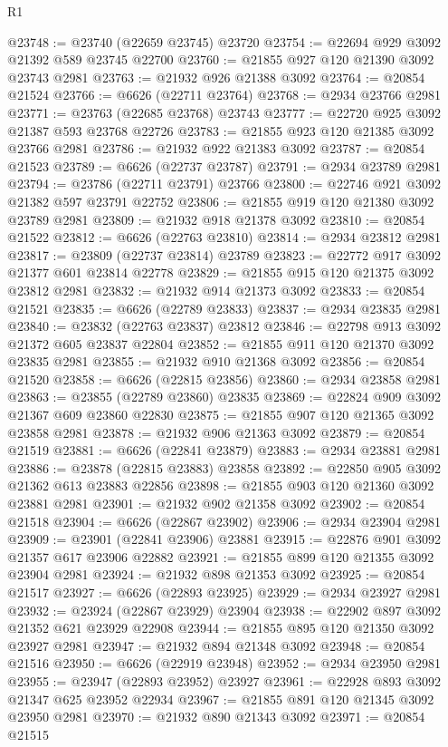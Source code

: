 \begin{lexlean}{R1}
\begin{coremodule}
@23748 := @23740 (@22659 @23745) @23720
@23754 := @22694 @929 @3092 @21392 @589 @23745 @22700
@23760 := @21855 @927 @120 @21390 @3092 @23743 @2981
@23763 := @21932 @926 @21388 @3092
@23764 := @20854 @21524
@23766 := @6626 (@22711 @23764)
@23768 := @2934 @23766 @2981
@23771 := @23763 (@22685 @23768) @23743
@23777 := @22720 @925 @3092 @21387 @593 @23768 @22726
@23783 := @21855 @923 @120 @21385 @3092 @23766 @2981
@23786 := @21932 @922 @21383 @3092
@23787 := @20854 @21523
@23789 := @6626 (@22737 @23787)
@23791 := @2934 @23789 @2981
@23794 := @23786 (@22711 @23791) @23766
@23800 := @22746 @921 @3092 @21382 @597 @23791 @22752
@23806 := @21855 @919 @120 @21380 @3092 @23789 @2981
@23809 := @21932 @918 @21378 @3092
@23810 := @20854 @21522
@23812 := @6626 (@22763 @23810)
@23814 := @2934 @23812 @2981
@23817 := @23809 (@22737 @23814) @23789
@23823 := @22772 @917 @3092 @21377 @601 @23814 @22778
@23829 := @21855 @915 @120 @21375 @3092 @23812 @2981
@23832 := @21932 @914 @21373 @3092
@23833 := @20854 @21521
@23835 := @6626 (@22789 @23833)
@23837 := @2934 @23835 @2981
@23840 := @23832 (@22763 @23837) @23812
@23846 := @22798 @913 @3092 @21372 @605 @23837 @22804
@23852 := @21855 @911 @120 @21370 @3092 @23835 @2981
@23855 := @21932 @910 @21368 @3092
@23856 := @20854 @21520
@23858 := @6626 (@22815 @23856)
@23860 := @2934 @23858 @2981
@23863 := @23855 (@22789 @23860) @23835
@23869 := @22824 @909 @3092 @21367 @609 @23860 @22830
@23875 := @21855 @907 @120 @21365 @3092 @23858 @2981
@23878 := @21932 @906 @21363 @3092
@23879 := @20854 @21519
@23881 := @6626 (@22841 @23879)
@23883 := @2934 @23881 @2981
@23886 := @23878 (@22815 @23883) @23858
@23892 := @22850 @905 @3092 @21362 @613 @23883 @22856
@23898 := @21855 @903 @120 @21360 @3092 @23881 @2981
@23901 := @21932 @902 @21358 @3092
@23902 := @20854 @21518
@23904 := @6626 (@22867 @23902)
@23906 := @2934 @23904 @2981
@23909 := @23901 (@22841 @23906) @23881
@23915 := @22876 @901 @3092 @21357 @617 @23906 @22882
@23921 := @21855 @899 @120 @21355 @3092 @23904 @2981
@23924 := @21932 @898 @21353 @3092
@23925 := @20854 @21517
@23927 := @6626 (@22893 @23925)
@23929 := @2934 @23927 @2981
@23932 := @23924 (@22867 @23929) @23904
@23938 := @22902 @897 @3092 @21352 @621 @23929 @22908
@23944 := @21855 @895 @120 @21350 @3092 @23927 @2981
@23947 := @21932 @894 @21348 @3092
@23948 := @20854 @21516
@23950 := @6626 (@22919 @23948)
@23952 := @2934 @23950 @2981
@23955 := @23947 (@22893 @23952) @23927
@23961 := @22928 @893 @3092 @21347 @625 @23952 @22934
@23967 := @21855 @891 @120 @21345 @3092 @23950 @2981
@23970 := @21932 @890 @21343 @3092
@23971 := @20854 @21515

\end{coremodule}
\end{lexlean}
